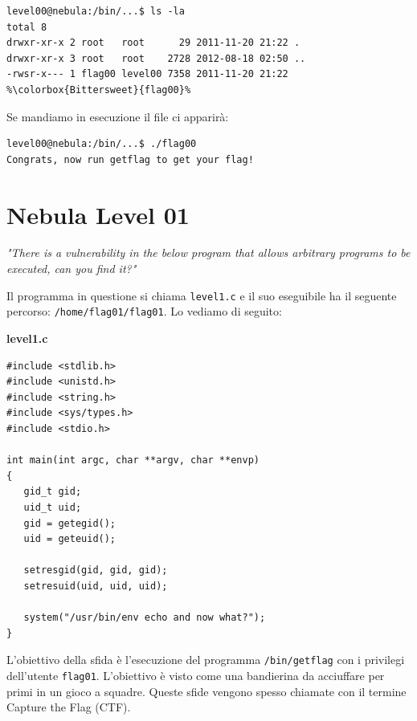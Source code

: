 \begin{mdframed}[backgroundcolor=white!20,shadow=false]
\begin{lstlisting}[escapechar=\%]
level00@nebula:/bin/...$ ls -la
total 8
drwxr-xr-x 2 root   root      29 2011-11-20 21:22 .
drwxr-xr-x 3 root   root    2728 2012-08-18 02:50 ..
-rwsr-x--- 1 flag00 level00 7358 2011-11-20 21:22 %\colorbox{Bittersweet}{flag00}%
\end{lstlisting}

\end{mdframed}
Se mandiamo in esecuzione il file ci apparirà:
\begin{mdframed}[backgroundcolor=white!20,shadow=false]
\begin{lstlisting}[escapechar=\%]
level00@nebula:/bin/...$ ./flag00
Congrats, now run getflag to get your flag!
\end{lstlisting}

\end{mdframed}

\section{Nebula Level 01}
\textit{"There is a vulnerability in the below program
that allows arbitrary programs to be executed,
can you find it?"}

\vspace{5mm}

Il programma in questione si chiama \texttt{level1.c}
e il suo eseguibile ha il seguente percorso:
\texttt{/home/flag01/flag01}. Lo vediamo di seguito:
\begin{mdframed}[backgroundcolor=white!20,shadow=false]
\textbf{level1.c}
\begin{verbatim}
#include <stdlib.h>
#include <unistd.h>
#include <string.h>
#include <sys/types.h>
#include <stdio.h>

int main(int argc, char **argv, char **envp)
{
   gid_t gid;
   uid_t uid;
   gid = getegid();
   uid = geteuid();
   
   setresgid(gid, gid, gid);
   setresuid(uid, uid, uid);
   
   system("/usr/bin/env echo and now what?");
}
\end{verbatim}
\end{mdframed}
L'obiettivo della sfida è l'esecuzione del programma \texttt{/bin/getflag} con i privilegi dell'utente \texttt{flag01}. L'obiettivo è visto come una bandierina da acciuffare per primi in un gioco a squadre. Queste sfide vengono spesso chiamate con il
termine Capture the Flag (CTF).

